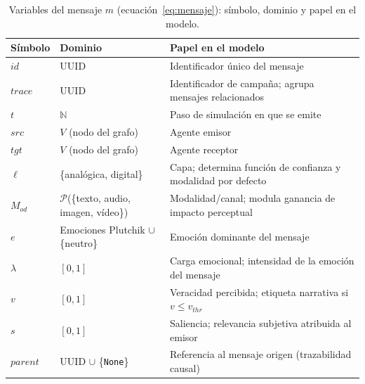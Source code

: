 \begin{table}[h!]
\centering
\caption{Variables del mensaje $m$ (ecuación~\ref{eq:mensaje}): símbolo, dominio y papel en el modelo.}
\label{tab:mensaje}
\begin{tabular}{@{}l p{4.2cm} p{8cm}@{}}
\toprule
\textbf{Símbolo} & \textbf{Dominio} & \textbf{Papel en el modelo} \\
\midrule
$id$       & UUID                                           & Identificador único del mensaje \\
$trace$    & UUID                                           & Identificador de campaña; agrupa mensajes relacionados \\
$t$        & $\mathbb{N}$                                   & Paso de simulación en que se emite \\
$src$      & $V$ (nodo del grafo)                           & Agente emisor \\
$tgt$      & $V$ (nodo del grafo)                           & Agente receptor \\
$\ell$     & \{analógica, digital\}                         & Capa; determina función de confianza y modalidad por defecto \\
$M_{od}$   & $\mathcal{P}$(\{texto, audio, imagen, vídeo\}) & Modalidad/canal; modula ganancia de impacto perceptual \\
$e$        & Emociones Plutchik $\cup$ \{neutro\}           & Emoción dominante del mensaje \cite{Plutchik1980} \\
$\lambda$  & $[0,1]$                                        & Carga emocional; intensidad de la emoción del mensaje \\
$v$        & $[0,1]$                                        & Veracidad percibida; etiqueta narrativa si $v \leq v_{thr}$ \\
$s$        & $[0,1]$                                        & Saliencia; relevancia subjetiva atribuida al emisor \\
$parent$   & UUID $\cup$ \{\texttt{None}\}                  & Referencia al mensaje origen (trazabilidad causal) \\
\bottomrule
\end{tabular}
\end{table}

